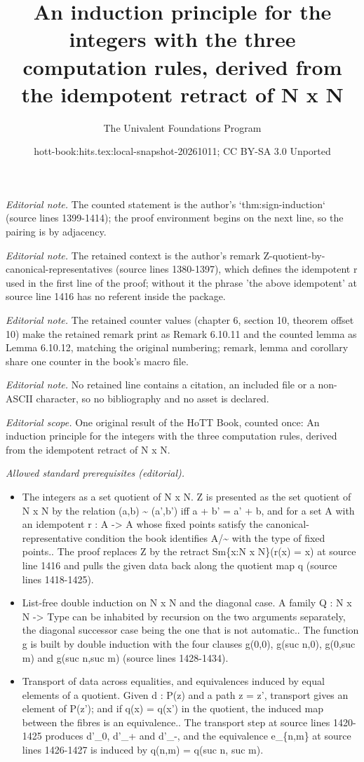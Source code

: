 \documentclass[10pt,a4paper]{article}
\title{An induction principle for the integers with the three computation rules, derived from the idempotent retract of N x N}
\author{The Univalent Foundations Program}
\date{hott-book:hits.tex:local-snapshot-20261011; CC BY-SA 3.0 Unported}
\newcounter{chapter}
\theoremstyle{definition}
\theoremstyle{remark}
\numberwithin{equation}{section}
\begin{document}
\maketitle
\setcounter{chapter}{6}
\setcounter{section}{10}
\setcounter{thm}{10}
\noindent\textit{Editorial note.} The counted statement is the author's `thm:sign-induction` (source lines 1399-1414); the proof environment begins on the next line, so the pairing is by adjacency.\par\medskip
\noindent\textit{Editorial note.} The retained context is the author's remark Z-quotient-by-canonical-representatives (source lines 1380-1397), which defines the idempotent r used in the first line of the proof; without it the phrase 'the above idempotent' at source line 1416 has no referent inside the package.\par\medskip
\noindent\textit{Editorial note.} The retained counter values (chapter 6, section 10, theorem offset 10) make the retained remark print as Remark 6.10.11 and the counted lemma as Lemma 6.10.12, matching the original numbering; remark, lemma and corollary share one counter in the book's macro file.\par\medskip
\noindent\textit{Editorial note.} No retained line contains a citation, an included file or a non-ASCII character, so no bibliography and no asset is declared.\par\medskip
\noindent\textit{Editorial scope.} One original result of the HoTT Book, counted once: An induction principle for the integers with the three computation rules, derived from the idempotent retract of N x N.\par\medskip
\noindent\textit{Allowed standard prerequisites (editorial).}\begin{itemize}
\item The integers as a set quotient of N x N. Z is presented as the set quotient of N x N by the relation (a,b) \textasciitilde{} (a',b') iff a + b' = a' + b, and for a set A with an idempotent r : A -> A whose fixed points satisfy the canonical-representative condition the book identifies A/\textasciitilde{} with the type of fixed points.. The proof replaces Z by the retract Sm\{x:N x N\}(r(x) = x) at source line 1416 and pulls the given data back along the quotient map q (source lines 1418-1425).
\item List-free double induction on N x N and the diagonal case. A family Q : N x N -> Type can be inhabited by recursion on the two arguments separately, the diagonal successor case being the one that is not automatic.. The function g is built by double induction with the four clauses g(0,0), g(suc n,0), g(0,suc m) and g(suc n,suc m) (source lines 1428-1434).
\item Transport of data across equalities, and equivalences induced by equal elements of a quotient. Given d : P(z) and a path z = z', transport gives an element of P(z'); and if q(x) = q(x') in the quotient, the induced map between the fibres is an equivalence.. The transport step at source lines 1420-1425 produces d'\_0, d'\_+ and d'\_-, and the equivalence e\_\{n,m\} at source lines 1426-1427 is induced by q(n,m) = q(suc n, suc m).
\end{itemize}\medskip
\end{document}
